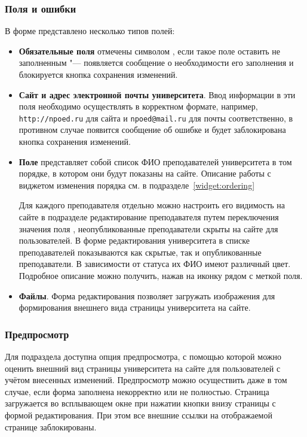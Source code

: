 	\subsubsection{Поля и ошибки}
	В форме представлено несколько типов полей:
	\begin{itemize}
		\item \textbf{Обязательные поля} отмечены символом \quotes{*}, если такое поле оставить не заполненным "--- появляется сообщение о необходимости его заполнения и блокируется кнопка сохранения изменений.
	
		\item \textbf{Сайт и адрес электронной почты университета}. Ввод информации в эти поля необходимо осуществлять в корректном формате, например, \texttt{http://npoed.ru} для сайта и \texttt{npoed@mail.ru} для почты соответственно, в противном случае появится сообщение об ошибке и будет заблокирована кнопка сохранения изменений.

		\item \textbf{Поле } представляет собой список ФИО преподавателей университета в том порядке, в котором они будут показаны на сайте. Описание работы с виджетом изменения порядка см. в подразделе~\ref{widget:ordering}

		Для каждого преподавателя отдельно можно настроить его видимость на сайте в подразделе редактирование преподавателя путем переключения значения поля , неопубликованные преподаватели скрыты на сайте для пользователей. В форме редактирования университета в списке преподавателей показываются как скрытые, так и опубликованные преподаватели. В зависимости от статуса их ФИО имеют различный цвет. Подробное описание можно получить, нажав на иконку  рядом с меткой поля.
		
		\item \textbf{Файлы}. Форма редактирования позволяет загружать изображения для формирования внешнего вида страницы университета на сайте. 
\end{itemize}
	
	\subsubsection{Предпросмотр}\label{university:edit_preview_ch}
	Для подраздела  доступна опция предпросмотра, с помощью которой можно оценить внешний вид страницы университета на сайте для пользователей с учётом внесенных изменений. Предпросмотр можно осуществить даже в том случае, если форма заполнена некорректно или не полностью. Страница загружается во всплывающем окне при нажатии кнопки  внизу страницы с формой редактирования. При этом все внешние ссылки на отображаемой странице заблокированы.
		
